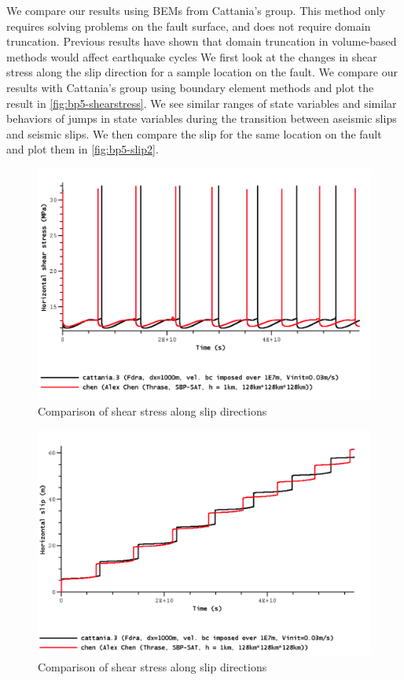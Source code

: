We compare our results using BEMs from Cattania's group. This method only requires solving problems on the fault surface, and does not require domain truncation. Previous results have shown that domain truncation in volume-based methods would affect earthquake cycles
We first look at the changes in shear stress along the slip direction for a sample location on the fault. We compare our results with Cattania's group using boundary element methods and plot the result in \autoref{fig:bp5-shearstress}. We see similar ranges of state variables and similar behaviors of jumps in state variables during the transition between aseismic slips and seismic slips. We then compare the slip for the same location on the fault and plot them in \autoref{fig:bp5-slip2}.

\begin{figure}
    \centering
    \includegraphics[width=\linewidth]{figures/sample-shearstress.png}
    \caption{Comparison of shear stress along slip directions}
    \label{fig:bp5-shearstress}
\end{figure}

\begin{figure}
    \centering
    \includegraphics[width=\linewidth]{figures/sample-slip-2.png}
    \caption{Comparison of shear stress along slip directions}
    \label{fig:bp5-slip2}
\end{figure}

